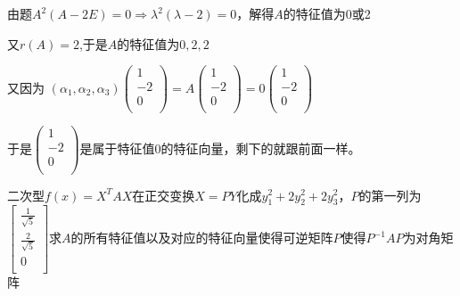 \documentclass[lang=cn,10pt]{elegantbook}
\begin{document}
\begin{solution}
	
	由题$A^2(A-2E)=0\Rightarrow \lambda ^2(\lambda -2)=0$，解得$A$的特征值为0或2
	
	又$r(A)=2$,于是$A$的特征值为$0,2,2$
	
	又因为
	$\left( \alpha _1,\alpha _2,\alpha _3 \right) \left( \begin{array}{c}
		1\\
		-2\\
		0\\
	\end{array} \right) =A\left( \begin{array}{c}
		1\\
		-2\\
		0\\
	\end{array} \right) =0\left( \begin{array}{c}
		1\\
		-2\\
		0\\
	\end{array} \right) $
	
	于是$\left( \begin{array}{c}
		1\\
		-2\\
		0\\
	\end{array} \right)$是属于特征值0的特征向量，剩下的就跟前面一样。
\end{solution}
\begin{example}
	二次型$f(x)=X^{T}AX$在正交变换$X=PY$化成$y^{2}_{1}+2y^{2}_{2}+2y^{2}_{3}$，$P$的第一列为$\left[ \begin{array}{c}
		\frac{1}{\sqrt{5}}\\
		\frac{2}{\sqrt{5}}\\
		0\\
	\end{array} \right] $求$A$的所有特征值以及对应的特征向量使得可逆矩阵$P$使得$P^{-1}AP$为对角矩阵
\end{example}
\end{document}
